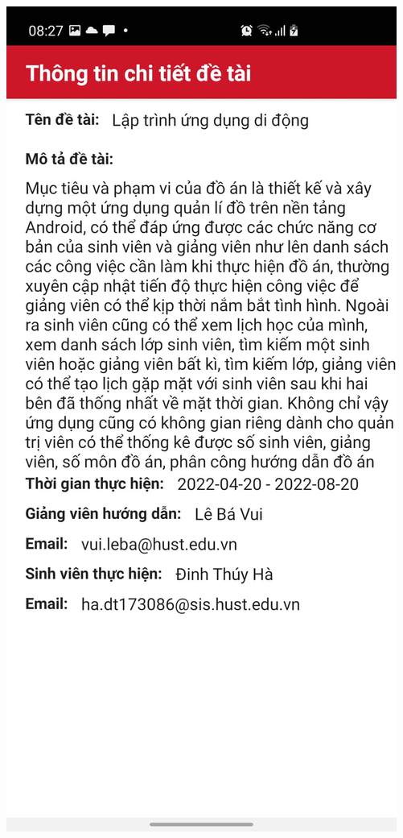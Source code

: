 \documentclass[../Main.tex]{subfiles}
\begin{document}
\noindent %
\begin{minipage}{0.5\textwidth}
\includegraphics[width=0.70\linewidth]{Figure/screen/information_topic.jpeg}
 \label{fig:information_topic}
\end{minipage}
\hspace{\fill}
\end{document}
